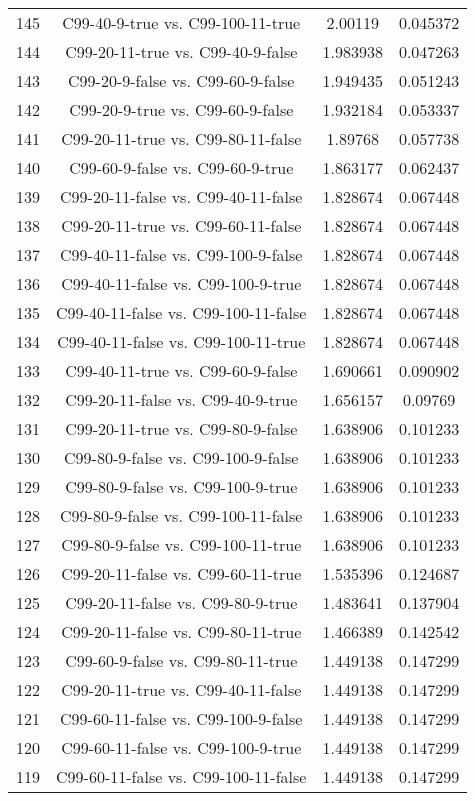 \documentclass[a4paper,10pt]{article}
\begin{document}
\begin{landscape}
\begin{table}[!htp]
\begin{tabular}{cccc}
145&C99-40-9-true vs. C99-100-11-true&2.00119&0.045372\\
144&C99-20-11-true vs. C99-40-9-false&1.983938&0.047263\\
143&C99-20-9-false vs. C99-60-9-false&1.949435&0.051243\\
142&C99-20-9-true vs. C99-60-9-false&1.932184&0.053337\\
141&C99-20-11-true vs. C99-80-11-false&1.89768&0.057738\\
140&C99-60-9-false vs. C99-60-9-true&1.863177&0.062437\\
139&C99-20-11-false vs. C99-40-11-false&1.828674&0.067448\\
138&C99-20-11-true vs. C99-60-11-false&1.828674&0.067448\\
137&C99-40-11-false vs. C99-100-9-false&1.828674&0.067448\\
136&C99-40-11-false vs. C99-100-9-true&1.828674&0.067448\\
135&C99-40-11-false vs. C99-100-11-false&1.828674&0.067448\\
134&C99-40-11-false vs. C99-100-11-true&1.828674&0.067448\\
133&C99-40-11-true vs. C99-60-9-false&1.690661&0.090902\\
132&C99-20-11-false vs. C99-40-9-true&1.656157&0.09769\\
131&C99-20-11-true vs. C99-80-9-false&1.638906&0.101233\\
130&C99-80-9-false vs. C99-100-9-false&1.638906&0.101233\\
129&C99-80-9-false vs. C99-100-9-true&1.638906&0.101233\\
128&C99-80-9-false vs. C99-100-11-false&1.638906&0.101233\\
127&C99-80-9-false vs. C99-100-11-true&1.638906&0.101233\\
126&C99-20-11-false vs. C99-60-11-true&1.535396&0.124687\\
125&C99-20-11-false vs. C99-80-9-true&1.483641&0.137904\\
124&C99-20-11-false vs. C99-80-11-true&1.466389&0.142542\\
123&C99-60-9-false vs. C99-80-11-true&1.449138&0.147299\\
122&C99-20-11-true vs. C99-40-11-false&1.449138&0.147299\\
121&C99-60-11-false vs. C99-100-9-false&1.449138&0.147299\\
120&C99-60-11-false vs. C99-100-9-true&1.449138&0.147299\\
119&C99-60-11-false vs. C99-100-11-false&1.449138&0.147299\\

\end{tabular}
\end{table}
\end{landscape}
\end{document}
